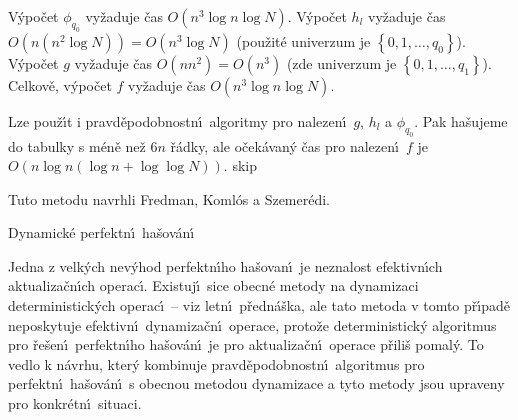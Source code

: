 \flushpar V\'ypo\v cet $\phi_{q_0}$ vy\v zaduje \v cas $O\left(n^3\log 
n\log N\right)$. V\'ypo\v cet $h_l$ 
vy\v za\-du\-je \v cas $O\left(n\left(n^2\log N\right)\right)=O\left(n^3\log N\right)$ (pou\v zit\'e univerzum je 
$\left\{0,1,\dots,q_0\right\}$). V\'ypo\v cet $g$ vy\v zaduje \v cas $O\left(nn^2
\right)=O\left(n^3\right)$ 
(zde univerzum je $\left\{0,1,\dots,q_1\right\}$). Celkov\v e, 
v\'ypo\v cet $f$ vy\v zaduje \v cas $O\left(n^3\log n\log N\right)$.
\medskip

\flushpar Lze pou\v z\'\i t i pravd\v epodobnostn\'\i\ algoritmy pro nalezen\'\i\ 
$g$, $h_l$ a $\phi_{q_0}$. Pak ha\v sujeme do tabulky s m\'en\v e ne\v z $
6n$ 
\v r\'adky, ale o\v cek\'avan\'y \v cas pro nalezen\'\i\ $f$ je 
$O\left(n\log n\left(\log n+\log\log N\right)\right)$.
skip

\flushpar Tuto metodu navrhli Fredman, Koml\'os a Szemer\'edi.
\medskip

\subhead
Dynamick\'e perfektn\'\i\ ha\v sov\'an\'\i
\endsubhead
\smallskip

\flushpar Jedna z velk\'ych nev\'yhod perfektn\'\i ho ha\v sovan\'\i\ je 
neznalost efektivn\'\i ch aktualiza\v cn\'\i ch ope\-rac\'\i . Existuj\'\i\ sice 
obecn\'e meto\-dy na dynamizaci deterministick\'ych operac\'\i\ -- viz 
letn\'\i\ p\v redn\'a\v s\-ka, ale tato metoda v tomto p\v r\'\i pad\v e neposkytuje 
efektivn\'\i\ dynamiza\v cn\'\i\ operace, proto\v ze deterministick\'y 
algoritmus pro \v re\-\v se\-n\'\i\ perfektn\'\i ho ha\v sov\'an\'\i\ je pro 
aktualiza\v cn\'\i\ ope\-race p\v rili\v s pomal\'y. To vedlo k n\'avrhu, 
kter\'y kombinuje pravd\v epodobnostn\'\i\ algoritmus pro perfektn\'\i\ 
ha\v sov\'an\'\i\ s obecnou metodou dynami\-za\-ce a tyto metody jsou 
upraveny pro konkr\'etn\'\i\ situaci. 
\medskip

